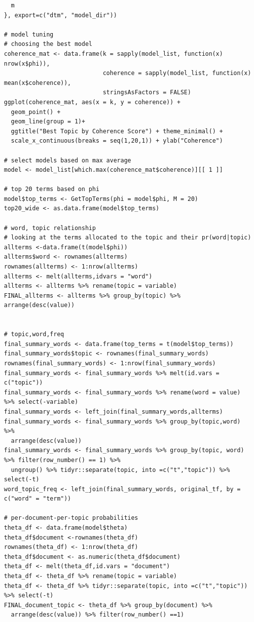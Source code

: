 \documentclass{article}
\begin{document}
\begin{lstlisting}
  m
}, export=c("dtm", "model_dir"))

# model tuning
# choosing the best model
coherence_mat <- data.frame(k = sapply(model_list, function(x) nrow(x$phi)), 
                            coherence = sapply(model_list, function(x) mean(x$coherence)), 
                            stringsAsFactors = FALSE)
ggplot(coherence_mat, aes(x = k, y = coherence)) +
  geom_point() +
  geom_line(group = 1)+
  ggtitle("Best Topic by Coherence Score") + theme_minimal() +
  scale_x_continuous(breaks = seq(1,20,1)) + ylab("Coherence")

# select models based on max average
model <- model_list[which.max(coherence_mat$coherence)][[ 1 ]]

# top 20 terms based on phi  
model$top_terms <- GetTopTerms(phi = model$phi, M = 20)
top20_wide <- as.data.frame(model$top_terms)

# word, topic relationship
# looking at the terms allocated to the topic and their pr(word|topic)
allterms <-data.frame(t(model$phi))
allterms$word <- rownames(allterms)
rownames(allterms) <- 1:nrow(allterms)
allterms <- melt(allterms,idvars = "word") 
allterms <- allterms %>% rename(topic = variable)
FINAL_allterms <- allterms %>% group_by(topic) %>% arrange(desc(value))


# topic,word,freq 
final_summary_words <- data.frame(top_terms = t(model$top_terms))
final_summary_words$topic <- rownames(final_summary_words)
rownames(final_summary_words) <- 1:nrow(final_summary_words)
final_summary_words <- final_summary_words %>% melt(id.vars = c("topic"))
final_summary_words <- final_summary_words %>% rename(word = value) %>% select(-variable)
final_summary_words <- left_join(final_summary_words,allterms)
final_summary_words <- final_summary_words %>% group_by(topic,word) %>%
  arrange(desc(value))
final_summary_words <- final_summary_words %>% group_by(topic, word) %>% filter(row_number() == 1) %>% 
  ungroup() %>% tidyr::separate(topic, into =c("t","topic")) %>% select(-t)
word_topic_freq <- left_join(final_summary_words, original_tf, by = c("word" = "term"))

# per-document-per-topic probabilities 
theta_df <- data.frame(model$theta)
theta_df$document <-rownames(theta_df) 
rownames(theta_df) <- 1:nrow(theta_df)
theta_df$document <- as.numeric(theta_df$document)
theta_df <- melt(theta_df,id.vars = "document")
theta_df <- theta_df %>% rename(topic = variable) 
theta_df <- theta_df %>% tidyr::separate(topic, into =c("t","topic")) %>% select(-t)
FINAL_document_topic <- theta_df %>% group_by(document) %>% 
  arrange(desc(value)) %>% filter(row_number() ==1)


\end{lstlisting}
\end{document}
